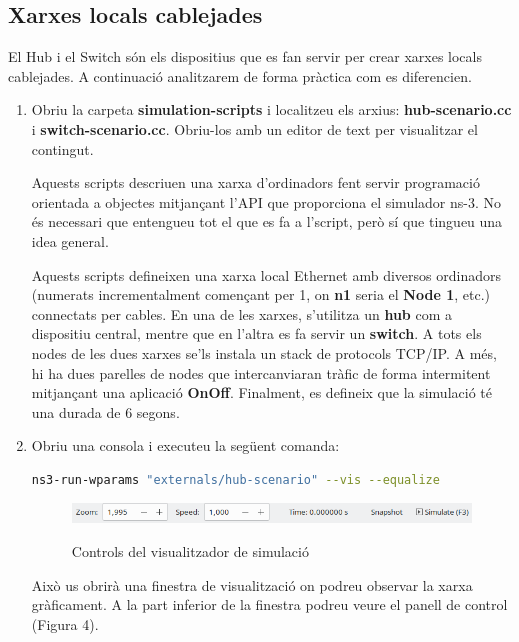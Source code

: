\documentclass[12pt,a4paper]{article}
\begin{document}
\subsection{Xarxes locals cablejades}

El Hub i el Switch són els dispositius que es fan servir per crear xarxes locals cablejades. A continuació analitzarem de forma pràctica com es diferencien.
\begin{enumerate}
\item Obriu la carpeta \textbf{simulation-scripts} i localitzeu els arxius: \textbf{hub-scenario.cc} i \textbf{switch-scenario.cc}. Obriu-los amb un editor de text per visualitzar el contingut.

Aquests scripts descriuen una xarxa d'ordinadors fent servir programació orientada a objectes mitjançant l'API que proporciona el simulador ns-3. No és necessari que entengueu tot el que es fa a l'script, però sí que tingueu una idea general.

Aquests scripts defineixen una xarxa local Ethernet amb diversos ordinadors (numerats incrementalment començant per 1, on \textbf{n1} seria el \textbf{Node 1}, etc.) connectats per cables. En una de les xarxes, s'utilitza un  \textbf{hub} com a dispositiu central, mentre que en l'altra es fa servir un  \textbf{switch}. A tots els nodes de les dues xarxes se'ls instala un stack de protocols TCP/IP. A més, hi ha dues parelles de nodes que intercanviaran tràfic de forma intermitent mitjançant una aplicació \textbf{OnOff}. Finalment, es defineix que la simulació té una durada de 6 segons.
\item Obriu una consola i executeu la següent comanda:
\begin{lstlisting}[language=bash,basicstyle=\footnotesize]
ns3-run-wparams "externals/hub-scenario" --vis --equalize
\end{lstlisting}

\begin{figure}[!ht]

  \begin{center}
  \label{simulator}
    \includegraphics[width=1\textwidth]{simulator}
    \caption{Controls del visualitzador de simulació}
  \end{center}
\end{figure}
Això us obrirà una finestra de visualització on podreu observar la xarxa gràficament. A la part inferior de la finestra podreu veure el panell de control (Figura 4).


\end{enumerate}
\end{document}
